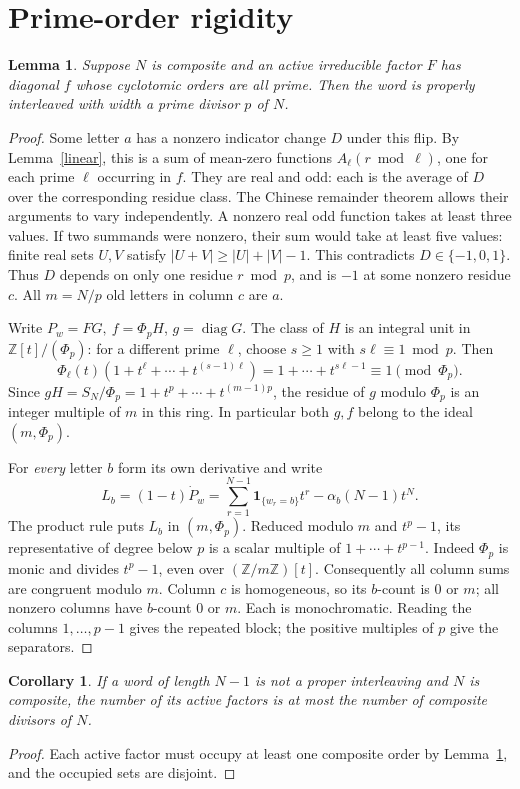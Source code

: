 \documentclass[11pt]{article}
\newtheorem{lemma}[theorem]{Lemma}
\newtheorem{corollary}[theorem]{Corollary}
\newcommand{\Z}{\mathbb Z}
\newcommand{\one}{\mathbf 1}
\DeclareMathOperator{\diag}{diag}
\begin{document}
\section{Prime-order rigidity}
\begin{lemma}\label{rigid}
Suppose \(N\) is composite and an active irreducible factor \(F\) has diagonal \(f\) whose cyclotomic orders are all prime. Then the word is properly interleaved with width a prime divisor \(p\) of \(N\).
\end{lemma}
\begin{proof}
Some letter \(a\) has a nonzero indicator change \(D\) under this flip. By Lemma~\ref{linear}, this is a sum of mean-zero functions \(A_\ell(r\bmod\ell)\), one for each prime \(\ell\) occurring in \(f\). They are real and odd: each is the average of \(D\) over the corresponding residue class. The Chinese remainder theorem allows their arguments to vary independently. A nonzero real odd function takes at least three values. If two summands were nonzero, their sum would take at least five values: finite real sets \(U,V\) satisfy \(|U+V|\ge |U|+|V|-1\). This contradicts \(D\in\{-1,0,1\}\). Thus \(D\) depends on only one residue \(r\bmod p\), and is \(-1\) at some nonzero residue \(c\). All \(m=N/p\) old letters in column \(c\) are \(a\).

Write \(P_w=FG,\ f=\Phi_p H\), \(g=\diag G\). The class of \(H\) is an integral unit in \(\Z[t]/(\Phi_p)\): for a different prime \(\ell\), choose \(s\ge1\) with \(s\ell\equiv1\bmod p\). Then
\[
 \Phi_\ell(t)(1+t^\ell+\cdots+t^{(s-1)\ell})
 =1+\cdots+t^{s\ell-1}\equiv 1\pmod{\Phi_p}.
\]
Since \(gH=S_N/\Phi_p=1+t^p+\cdots+t^{(m-1)p}\), the residue of \(g\) modulo \(\Phi_p\) is an integer multiple of \(m\) in this ring. In particular both \(g,f\) belong to the ideal \((m,\Phi_p)\).

For \emph{every} letter \(b\) form its own derivative and write
\[
 L_b=(1-t)\dot P_w
 =\sum_{r=1}^{N-1}\one_{\{w_r=b\}}t^r-\alpha_b(N-1)t^N.
\]
The product rule puts \(L_b\) in \((m,\Phi_p)\). Reduced modulo \(m\) and \(t^p-1\), its representative of degree below \(p\) is a scalar multiple of \(1+\cdots+t^{p-1}\). Indeed \(\Phi_p\) is monic and divides \(t^p-1\), even over \((\Z/m\Z)[t]\). Consequently all column sums are congruent modulo \(m\). Column \(c\) is homogeneous, so its \(b\)-count is \(0\) or \(m\); all nonzero columns have \(b\)-count \(0\) or \(m\). Each is monochromatic. Reading the columns \(1,\dots,p-1\) gives the repeated block; the positive multiples of \(p\) give the separators.
\end{proof}
\begin{corollary}\label{bound}
If a word of length \(N-1\) is not a proper interleaving and \(N\) is composite, the number of its active factors is at most the number of \emph{composite} divisors of \(N\).
\end{corollary}
\begin{proof}
Each active factor must occupy at least one composite order by Lemma~\ref{rigid}, and the occupied sets are disjoint.
\end{proof}
\end{document}
